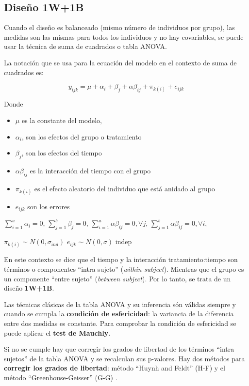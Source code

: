 \documentclass[
]{book}
\providecommand{\tightlist}{%
  \setlength{\itemsep}{0pt}\setlength{\parskip}{0pt}}
\begin{document}
\hypertarget{diseuxf1o-1w1b}{%
\subsection{Diseño 1W+1B}\label{diseuxf1o-1w1b}}

Cuando el diseño es balanceado (mismo número de individuos por grupo), las medidas son las mismas para todos los individuos y no hay covariables, se puede usar la técnica de suma de cuadrados o tabla ANOVA.

La notación que se usa para la ecuación del modelo en el contexto de suma de cuadrados es:

\[y_{ijk} = \mu + \alpha_i + \beta_j + \alpha\beta_{ij} + \pi_{k(i)} + e_{ijk}\]

Donde

\begin{itemize}
\tightlist
\item
  \(\mu\) es la constante del modelo,
\item
  \(\alpha_i\), son los efectos del grupo o tratamiento
\item
  \(\beta_j\), son los efectos del tiempo
\item
  \(\alpha\beta_{ij}\) es la interacción del tiempo con el grupo
\item
  \(\pi_{k(i)}\) es el efecto aleatorio del individuo que está anidado al grupo
\item
  \(e_{ijk}\) son los errores
\end{itemize}

\(\sum_{i=1}^a \alpha_i=0\), \(\sum_{j=1}^b \beta_j=0\), \(\sum_{i=1}^a \alpha\beta_{ij}=0, \forall j\), \(\sum_{j=1}^b \alpha\beta_{ij}=0, \forall i\),

\(\pi_{k(i)} \sim N(0, \sigma_{ind})\)
\(e_{ijk} \sim N(0, \sigma)\) indep

En este contexto se dice que el tiempo y la interacción tratamiento:tiempo son términos o componentes ``intra sujeto'' (\emph{within subject}). Mientras que el grupo es un componente ``entre sujeto'' (\emph{between subject}). Por lo tanto, se trata de un diseño \textbf{1W+1B}.

Las técnicas clásicas de la tabla ANOVA y su inferencia són válidas siempre y cuando se cumpla la \textbf{condición de esfericidad}: la variancia de la diferencia entre dos medidas es constante. Para comprobar la condición de esfericidad se puede aplicar el \textbf{test de Mauchly}.

Si no se cumple hay que corregir los grados de libertad de los términos ``intra sujetos'' de la tabla ANOVA y se recalculan sus p-valores. Hay dos métodos para \textbf{corregir los grados de libertad}: método ``Huynh and Feldt'' (H-F) y el método ``Greenhouse-Geisser'' (G-G) .
\end{document}
